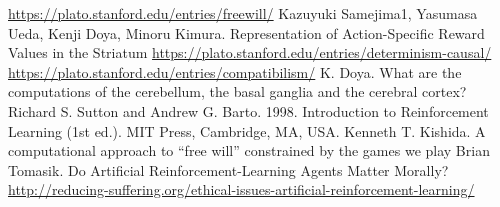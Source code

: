 \documentclass[a4paper]{article}
\begin{document}
\begin{thebibliography}{20}
 \url{https://plato.stanford.edu/entries/freewill/}
 Kazuyuki Samejima1, Yasumasa Ueda, Kenji Doya, Minoru Kimura. Representation of Action-Specific Reward Values in the Striatum
 \url{https://plato.stanford.edu/entries/determinism-causal/}
 \url{https://plato.stanford.edu/entries/compatibilism/}
 K. Doya. What are the computations of the cerebellum, the basal ganglia and the cerebral cortex?
 Richard S. Sutton and Andrew G. Barto. 1998. Introduction to Reinforcement Learning (1st ed.). MIT Press, Cambridge, MA, USA.
 Kenneth T. Kishida. A computational approach to “free will” constrained by the games we play
 Brian Tomasik. Do Artificial Reinforcement-Learning Agents Matter Morally?
 \url{http://reducing-suffering.org/ethical-issues-artificial-reinforcement-learning/}

\end{thebibliography}
\end{document}
